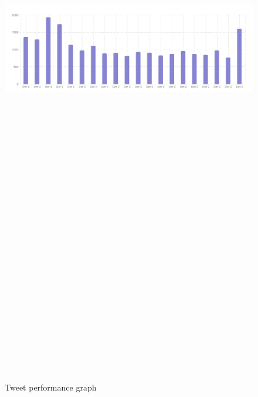 \documentclass[a4paper,12pt]{article}
\begin{document}
{{{ \begin{figure}[htbp]
			\centering
			\includegraphics[width=6in, height=15in, keepaspectratio]{tweet_performance.png}
			\label{per}
			\caption{Tweet performance graph}
		\end{figure}
  




}}}
\end{document}
